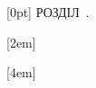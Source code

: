 \makeatletter
\newenvironment{conclusionsection}{%
  \clearpage
  \ESKD@enable@column@viifalse
  \setcounter{secnumdepth}{0}
  \renewcommand{\sectionbreak}{}%
}{%
  \clearpage
  \setcounter{secnumdepth}{3}%
}
\makeatother

\contentsmargin{0pt}

[0pt]
  {\addvspace{0.6em}}
  {РОЗДІЛ~\thecontentslabel.\enspace}
  {}
  {\thecontentspage}

[2em]
  {}
  {\thecontentslabel\enspace}
  {}
  {\thecontentspage}

[4em]
  {}
  {\thecontentslabel\enspace}
  {}
  {\thecontentspage}


